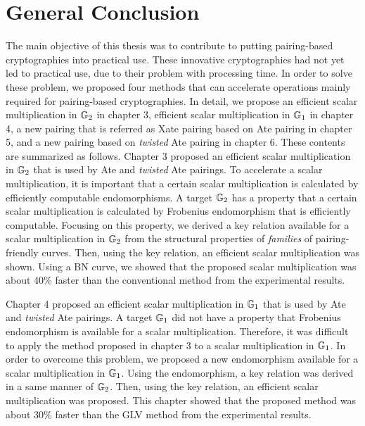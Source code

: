 \chapter{General Conclusion}
\label{ch:general_conclusin}
The main objective of this thesis was to contribute to putting pairing-based cryptographies into practical use.
These innovative cryptographies had not yet led to practical use, due to their problem with processing time.
In order to solve these problem, we proposed four methods that can accelerate operations mainly required for pairing-based cryptographies.    
In detail, we propose an efficient scalar multiplication in ${\mathbb{G}}_{2}$ in chapter 3, efficient scalar multiplication in ${\mathbb{G}}_{1}$ in chapter 4, a new pairing that is referred as Xate pairing based on Ate pairing in chapter 5, and a new pairing based on {\it twisted} Ate pairing in chapter 6.
These contents are summarized as follows. 
Chapter 3 proposed an efficient scalar multiplication in ${\mathbb{G}}_{2}$ that is used by Ate and {\it twisted} Ate pairings.
To accelerate a scalar multiplication, it is important that a certain scalar multiplication is calculated by efficiently computable endomorphisms.
A target ${\mathbb{G}}_{2}$ has a property that a certain scalar multiplication is calculated by Frobenius endomorphism that is efficiently computable.
Focusing on this property, we derived a key relation available for a scalar multiplication in ${\mathbb{G}}_{2}$ from the structural properties of {\it families} of pairing-friendly curves.
Then, using the key relation, an efficient scalar multiplication was shown.
Using a BN curve, we showed that the proposed scalar multiplication was about 40\% faster than the conventional method from the experimental results.   

Chapter 4 proposed an efficient scalar multiplication in ${\mathbb{G}}_{1}$ that is used by Ate and {\it twisted} Ate pairings.
A target ${\mathbb{G}}_{1}$ did not have a property that Frobenius endomorphism is available for a scalar multiplication.
Therefore, it was difficult to apply the method proposed in chapter 3 to a scalar multiplication in ${\mathbb{G}}_{1}$.
In order to overcome this problem, we proposed a new endomorphism available for a scalar multiplication in ${\mathbb{G}}_{1}$.
Using the endomorphism, a key relation was derived in a same manner of ${\mathbb{G}}_{2}$.
Then, using the key relation, an efficient scalar multiplication was proposed.   
This chapter showed that the proposed method was about 30\% faster than the GLV method from the experimental results.   

